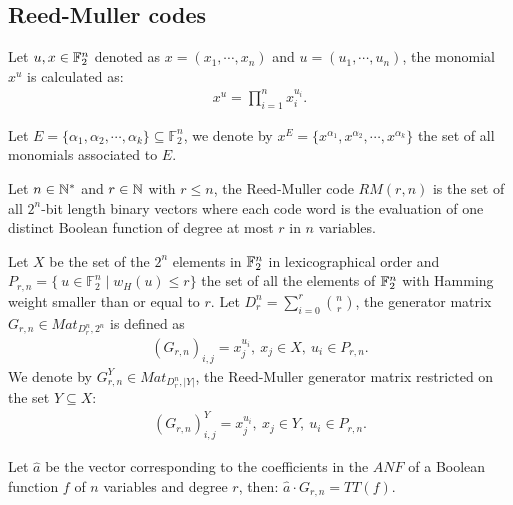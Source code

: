 \documentclass[11pt]{llncs}
\begin{document}
\subsection{Reed-Muller codes}

\begin{definition}
    Let $u, x\in \mathbb{F}_2^n$ denoted as $x=(x_1,\cdots,x_n)$ and $u=(u_1,\cdots,u_n)$, the monomial $x^{u}$ is calculated as:
    \begin{align*}
        x^{u} = \prod_{i=1}^n x_i^{u_i}.
    \end{align*}
    
    Let $E = \{\alpha_1, \alpha_2, \cdots, \alpha_k\} \subseteq \mathbb{F}_2^n$, we denote by $x^E = \{x^{\alpha_1}, x^{\alpha_2}, \cdots, x^{\alpha_k}\}$ the set of all monomials associated to $E$.
\end{definition}


\begin{definition}
	Let $n\in \mathbb{N}^*$ and $r\in \mathbb{N}$ with $r\leq n$, the Reed-Muller code $RM(r,n)$ is the set of all $2^n$-bit length binary vectors where each code word is the evaluation of one distinct Boolean function of degree at most $r$ in $n$ variables.
\end{definition}



\begin{definition}\label{rmGenerator}
	Let $X$ be the set of the $2^n$ elements in $\mathbb{F}_2^n$ in lexicographical order and $P_{r,n} = \{\ u\in \mathbb{F}_2^n \mid w_H(u) \leq r\}$ the set of all the elements of $\mathbb{F}_2^n$ with Hamming weight smaller than or equal to $r$. Let $D_r^n = \sum_{i=0}^r \binom{n}{r}$, 
	the generator matrix $G_{r,n}\in Mat_{D_r^n,2^n}$ is defined as
	\begin{align*}
\left(G_{r,n}\right)_{i,j} = x_j^{u_i}, \ x_j \in X,\ u_i \in P_{r,n}.
	\end{align*}
	We denote by $G_{r,n}^Y\in Mat_{D_r^n,|Y|}$, the Reed-Muller generator matrix restricted on the set $Y \subseteq X$:
	\begin{align*}
	\left(G_{r,n}\right)^Y_{i,j} = x_j^{u_i}, \ x_j \in Y,\ u_i \in P_{r,n}.
	\end{align*}
\end{definition}

\begin{remark}
	Let $\hat{a}$ be the vector corresponding to the coefficients in the $ANF$ of a Boolean function $f$ of $n$ variables and degree $r$, then: $\hat{a} \cdot  G_{r,n} = TT(f)$.
\end{remark}
\end{document}
